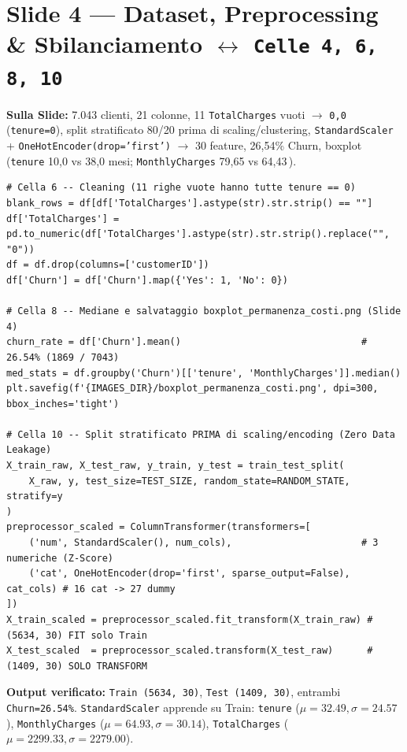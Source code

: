 \documentclass[10pt, a4paper]{article}
\begin{document}
\section*{Slide 4 --- Dataset, Preprocessing \& Sbilanciamento $\leftrightarrow$ \texttt{Celle 4, 6, 8, 10}}
\noindent\textbf{Sulla Slide:} 7.043 clienti, 21 colonne, 11 \texttt{TotalCharges} vuoti $\rightarrow$ \texttt{0,0\,\texteuro} (\texttt{tenure=0}), split stratificato 80/20 prima di scaling/clustering, \texttt{StandardScaler} + \texttt{OneHotEncoder(drop='first')} $\rightarrow$ 30 feature, 26,54\% Churn, boxplot (\texttt{tenure} 10,0 vs 38,0 mesi; \texttt{MonthlyCharges} 79,65 vs 64,43\,\texteuro).
\begin{lstlisting}
# Cella 6 -- Cleaning (11 righe vuote hanno tutte tenure == 0)
blank_rows = df[df['TotalCharges'].astype(str).str.strip() == ""]
df['TotalCharges'] = pd.to_numeric(df['TotalCharges'].astype(str).str.strip().replace("", "0"))
df = df.drop(columns=['customerID'])
df['Churn'] = df['Churn'].map({'Yes': 1, 'No': 0})

# Cella 8 -- Mediane e salvataggio boxplot_permanenza_costi.png (Slide 4)
churn_rate = df['Churn'].mean()                                # 26.54% (1869 / 7043)
med_stats = df.groupby('Churn')[['tenure', 'MonthlyCharges']].median()
plt.savefig(f'{IMAGES_DIR}/boxplot_permanenza_costi.png', dpi=300, bbox_inches='tight')

# Cella 10 -- Split stratificato PRIMA di scaling/encoding (Zero Data Leakage)
X_train_raw, X_test_raw, y_train, y_test = train_test_split(
    X_raw, y, test_size=TEST_SIZE, random_state=RANDOM_STATE, stratify=y
)
preprocessor_scaled = ColumnTransformer(transformers=[
    ('num', StandardScaler(), num_cols),                       # 3 numeriche (Z-Score)
    ('cat', OneHotEncoder(drop='first', sparse_output=False), cat_cols) # 16 cat -> 27 dummy
])
X_train_scaled = preprocessor_scaled.fit_transform(X_train_raw) # (5634, 30) FIT solo Train
X_test_scaled  = preprocessor_scaled.transform(X_test_raw)      # (1409, 30) SOLO TRANSFORM
\end{lstlisting}
\noindent\textbf{Output verificato:} \texttt{Train (5634, 30)}, \texttt{Test (1409, 30)}, entrambi \texttt{Churn=26.54\%}. \texttt{StandardScaler} apprende su Train: \texttt{tenure} ($\mu=32.49,\sigma=24.57$), \texttt{MonthlyCharges} ($\mu=64.93,\sigma=30.14$), \texttt{TotalCharges} ($\mu=2299.33,\sigma=2279.00$).
\end{document}
